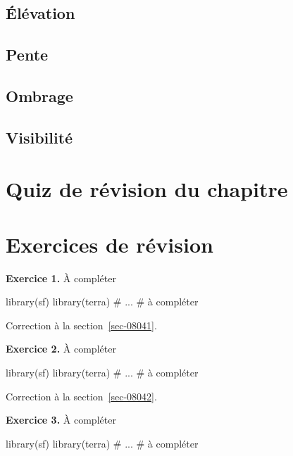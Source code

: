 \documentclass[
  letterpaper,
  DIV=11,
  numbers=noendperiod]{scrreprt}
\newenvironment{Shaded}{\begin{snugshade}}{\end{snugshade}}
\newcommand{\CommentTok}[1]{\textcolor[rgb]{0.37,0.37,0.37}{#1}}
\newcommand{\NormalTok}[1]{\textcolor[rgb]{0.00,0.23,0.31}{#1}}
\begin{document}
\subsection{Élévation}\label{sec-0451}

\subsection{Pente}\label{sec-0452}

\subsection{Ombrage}\label{sec-0453}

\subsection{Visibilité}\label{sec-0454}

\section{Quiz de révision du chapitre}\label{sec-046}

\section{Exercices de révision}\label{sec-047}

\textbf{Exercice 1.} À compléter

\begin{Shaded}
\begin{Highlighting}[]
\NormalTok{library(sf)}
\NormalTok{library(terra)}
\CommentTok{\# ...}
\CommentTok{\# à compléter}
\end{Highlighting}
\end{Shaded}

Correction à la section~\ref{sec-08041}.

\textbf{Exercice 2.} À compléter

\begin{Shaded}
\begin{Highlighting}[]
\NormalTok{library(sf)}
\NormalTok{library(terra)}
\CommentTok{\# ...}
\CommentTok{\# à compléter}
\end{Highlighting}
\end{Shaded}

Correction à la section~\ref{sec-08042}.

\textbf{Exercice 3.} À compléter

\begin{Shaded}
\begin{Highlighting}[]
\NormalTok{library(sf)}
\NormalTok{library(terra)}
\CommentTok{\# ...}
\CommentTok{\# à compléter}
\end{Highlighting}
\end{Shaded}
\end{document}
